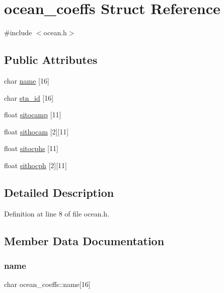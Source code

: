 \hypertarget{structocean__coeffs}{}\section{ocean\+\_\+coeffs Struct Reference}
\label{structocean__coeffs}


{\ttfamily \#include $<$ocean.\+h$>$}

\subsection*{Public Attributes}
\begin{DoxyCompactItemize}
\item 
char \hyperlink{structocean__coeffs_a6825cc7e5845db552b986848d09c4319}{name} \mbox{[}16\mbox{]}
\item 
char \hyperlink{structocean__coeffs_a50b3096650d5ecc838c8ec5ac89c1047}{stn\+\_\+id} \mbox{[}16\mbox{]}
\item 
float \hyperlink{structocean__coeffs_a0fcf77d9737d663f002d9e4850526d65}{sitocamp} \mbox{[}11\mbox{]}
\item 
float \hyperlink{structocean__coeffs_ab29e9de9ddc0e54236d18095651fa0ae}{sithocam} \mbox{[}2\mbox{]}\mbox{[}11\mbox{]}
\item 
float \hyperlink{structocean__coeffs_aee716356287de77fa21fa2f0c91ee603}{sitocphs} \mbox{[}11\mbox{]}
\item 
float \hyperlink{structocean__coeffs_a275a2b32e7ed67b17a89e4aa5206e71b}{sithocph} \mbox{[}2\mbox{]}\mbox{[}11\mbox{]}
\end{DoxyCompactItemize}


\subsection{Detailed Description}


Definition at line 8 of file ocean.\+h.



\subsection{Member Data Documentation}
\mbox{\label{structocean__coeffs_a6825cc7e5845db552b986848d09c4319}} 
\subsubsection{\texorpdfstring{name}{name}}
{\footnotesize\ttfamily char ocean\+\_\+coeffs\+::name\mbox{[}16\mbox{]}}



